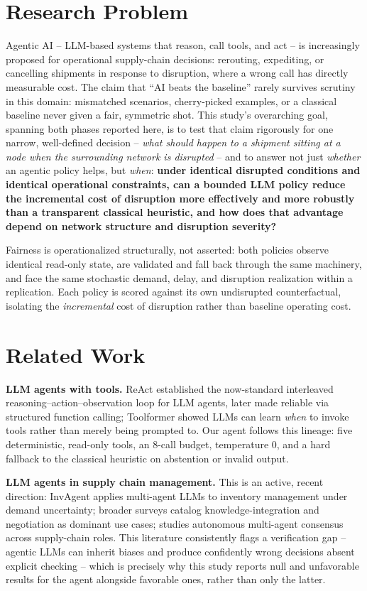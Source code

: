 \documentclass[10pt,twocolumn]{article}
\begin{document}
\section{Research Problem}
\label{sec:intro}
Agentic AI -- LLM-based systems that reason, call tools, and act -- is increasingly proposed for operational supply-chain decisions: rerouting, expediting, or cancelling shipments in response to disruption, where a wrong call has directly measurable cost. The claim that ``AI beats the baseline'' rarely survives scrutiny in this domain: mismatched scenarios, cherry-picked examples, or a classical baseline never given a fair, symmetric shot. This study's overarching goal, spanning both phases reported here, is to test that claim rigorously for one narrow, well-defined decision -- \emph{what should happen to a shipment sitting at a node when the surrounding network is disrupted} -- and to answer not just \emph{whether} an agentic policy helps, but \emph{when}: \textbf{under identical disrupted conditions and identical operational constraints, can a bounded LLM policy reduce the incremental cost of disruption more effectively and more robustly than a transparent classical heuristic, and how does that advantage depend on network structure and disruption severity?}

Fairness is operationalized structurally, not asserted: both policies observe identical read-only state, are validated and fall back through the same machinery, and face the same stochastic demand, delay, and disruption realization within a replication. Each policy is scored against its own undisrupted counterfactual, isolating the \emph{incremental} cost of disruption rather than baseline operating cost.

\section{Related Work}
\label{sec:relwork}
\textbf{LLM agents with tools.} ReAct \cite{yao2022react} established the now-standard interleaved reasoning--action--observation loop for LLM agents, later made reliable via structured function calling; Toolformer \cite{schick2023toolformer} showed LLMs can learn \emph{when} to invoke tools rather than merely being prompted to. Our agent follows this lineage: five deterministic, read-only tools, an 8-call budget, temperature 0, and a hard fallback to the classical heuristic on abstention or invalid output.

\textbf{LLM agents in supply chain management.} This is an active, recent direction: InvAgent \cite{invagent2024} applies multi-agent LLMs to inventory management under demand uncertainty; broader surveys \cite{llmscm2025} catalog knowledge-integration and negotiation as dominant use cases; \cite{agenticscm2025} studies autonomous multi-agent consensus across supply-chain roles. This literature consistently flags a verification gap -- agentic LLMs can inherit biases and produce confidently wrong decisions absent explicit checking -- which is precisely why this study reports null and unfavorable results for the agent alongside favorable ones, rather than only the latter.
\end{document}

